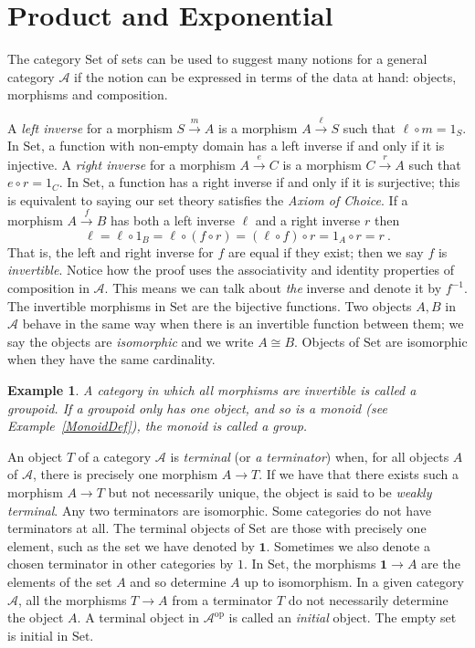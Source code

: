 \documentclass[a4paper,12pt]{article}
\newtheorem{example}[theorem]{Example}
\theoremstyle{step}
\newcommand{\xra}{\xrightarrow}
\def\CA{{\mathscr A}}
\begin{document}
\section{Product and Exponential}\label{ProdExp}
The category $\mathrm{Set}$ of sets can be used to suggest many notions for a general category $\CA$ if the notion can be expressed in terms of the data at hand: objects, morphisms and composition.

A {\em left inverse} for a morphism $S\xra{m}A$ is a morphism $A\xra{\ell}S$ such that $\ell\circ m = 1_S$. In $\mathrm{Set}$, a function with non-empty domain has a left inverse if and only if it is injective. A {\em right inverse} for a morphism $A\xra{e}C$ is a morphism $C\xra{r}A$ such that $e\circ r = 1_C$. In $\mathrm{Set}$, a function has a right inverse if and only if it is surjective; this is equivalent to saying our set theory satisfies the {\em Axiom of Choice}. If a morphism $A\xra{f}B$
has both a left inverse $\ell$ and a right inverse $r$ then
$$\ell = \ell \circ 1_B = \ell \circ (f\circ r) = (\ell \circ f)\circ r = 1_A\circ r = r \ .$$    
That is, the left and right inverse for $f$ are equal if they exist; then we say $f$ is {\em invertible}. Notice how the proof uses the 
associativity and identity properties of composition in $\CA$. This means we can talk about {\em the}
inverse and denote it by $f^{-1}$. The invertible morphisms in $\mathrm{Set}$ are the bijective functions. Two objects $A, B$ in $\CA$ behave in the same way when there is an invertible function between them; we say the objects are {\em isomorphic} and we write $A\cong B$.
Objects of $\mathrm{Set}$ are isomorphic when they have the same cardinality. 

\begin{example} A category in which all morphisms are invertible is called a {\em groupoid}.
If a groupoid only has one object, and so is a monoid (see Example~\ref{MonoidDef}), the monoid is called a {\em group}.
\end{example} 

An object $T$ of a category $\CA$ is {\em terminal} (or {\em a terminator}) when, for all objects
$A$ of $\CA$, there is precisely one morphism $A\to T$. If we have that there exists such
a morphism $A\to T$ but not necessarily unique, the object is said to be {\em weakly terminal}. Any two terminators are isomorphic. Some categories do not have terminators at all.
 The terminal objects of $\mathrm{Set}$
are those with precisely one element, such as the set we have denoted by $\mathbf{1}$. 
Sometimes we also denote a chosen terminator in other categories by $1$. In
$\mathrm{Set}$, the morphisms $\mathbf{1}\to A$ are the elements of the set $A$ and so
determine $A$ up to isomorphism. In a given category $\CA$, all the morphisms $T\to A$  
from a terminator $T$ do not necessarily determine the object $A$. A terminal object in
$\CA^{\mathrm{op}}$ is called an {\em initial} object. The empty set is initial in $\mathrm{Set}$.
\end{document}
